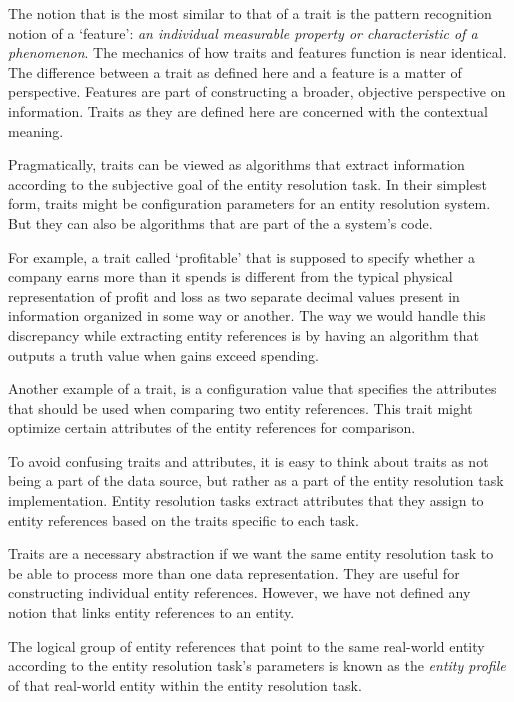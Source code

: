 \documentclass[journal]{IEEEtran}
\begin{document}
    The notion that is the most similar to that of a trait is the pattern
    recognition notion of a `feature':
    \textit{an individual measurable property or characteristic of a
    phenomenon}\cite{bishop2006pattern}.
    The mechanics of how traits and features function is near identical.
    The difference between a trait as defined here and a feature is a matter of
    perspective.
    Features are part of constructing a broader, objective perspective on
    information.
    Traits as they are defined here are concerned with the contextual meaning.
    
    Pragmatically, traits can be viewed as algorithms that extract information
    according to the subjective goal of the entity resolution task.
    In their simplest form, traits might be configuration parameters for an
    entity resolution system.
    But they can also be algorithms that are part of the a system's code.

    For example, a trait called `profitable' that is supposed to specify whether
    a company earns more than it spends is different from the typical physical
    representation of profit and loss as two separate decimal values present
    in information organized in some way or another.
    The way we would handle this discrepancy while extracting entity references
    is by having an algorithm that outputs a truth value when gains exceed
    spending.

    Another example of a trait, is a configuration value that specifies the
    attributes that should be used when comparing two entity references.
    This trait might optimize certain attributes of the entity references for
    comparison.
    
    To avoid confusing traits and attributes, it is easy to think about traits
    as not being a part of the data source, but rather as a part of the entity
    resolution task implementation.
    Entity resolution tasks extract attributes that they assign to entity
    references based on the traits specific to each task.

    Traits are a necessary abstraction if we want the same entity resolution
    task to be able to process more than one data representation.
    They are useful for constructing individual entity references.
    However, we have not defined any notion that links entity references to an
    entity.
    
    \begin{defn}
        The logical group of entity references that point to the same real-world
        entity according to the entity resolution task's parameters is known as
        the \textit{entity profile} of that real-world entity within the entity
        resolution task.
    \end{defn}
\end{document}
